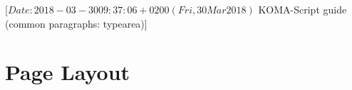 %
%
%
%
%
%
%
%
% 
%
%
%
%

                 [$Date: 2018-03-30 09:37:06 +0200 (Fri, 30 Mar 2018) $
                  KOMA-Script guide (common paragraphs: typearea)]


\section{Page Layout}
\BeginIndexGroup
{}

